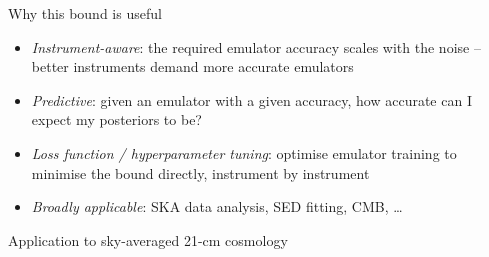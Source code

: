 \documentclass[aspectratio=169, 12pt]{beamer}
\newcommand{\sectionframe}[1]{%
    \begin{frame}{}
        \vfill
        \begin{center}{\large #1}\end{center}
        \vfill
    \end{frame}%
}
\begin{document}
\begin{frame}{Why this bound is useful}
    \begin{itemize}
        \item \textit{Instrument-aware}: the required emulator accuracy scales with the
              noise -- better instruments demand more accurate emulators
        \item \textit{Predictive}: given an emulator with a given accuracy, how
              accurate can I expect my posteriors to be? 
        \item \textit{Loss function / hyperparameter tuning}: optimise emulator
              training to minimise the bound directly, instrument by instrument
        \item \textit{Broadly applicable}: SKA data analysis, SED fitting, CMB, \ldots
    \end{itemize}
\end{frame}

\sectionframe{Application to sky-averaged 21-cm cosmology}
\end{document}
